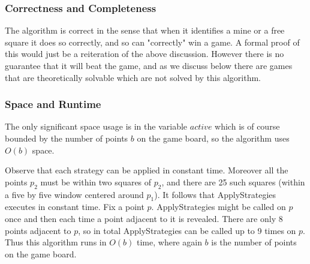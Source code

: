 \documentclass{article}
\theoremstyle{definition}
\theoremstyle{definition}
\theoremstyle{theorem}
\begin{document}
	
	\subsubsection{Correctness and Completeness}
	The algorithm is correct in the sense that when it identifies a mine or a free square it does so correctly, and so can "correctly" win a game. A formal proof of this would just be a reiteration of the above discussion. However there is no guarantee that it will beat the game, and as we discuss below there are games that are theoretically solvable which are not solved by this algorithm.
	\subsubsection{Space and Runtime}
	The only significant space usage is in the variable $active$ which is of course bounded by the number of points $b$ on the game board, so the algorithm uses $O(b)$ space.
	
	Observe that each strategy can be applied in constant time. Moreover all the points $p_2$ must be within two squares of $p_2$, and there are 25 such squares (within a five by five window centered around $p_1$). It follows that ApplyStrategies executes in constant time. Fix a point $p$. ApplyStrategies might be called on $p$ once and then each time a point adjacent to it is revealed. There are only 8 points adjacent to $p$, so in total ApplyStrategies can be called up to 9 times on $p$. Thus this algorithm runs in $O(b)$ time, where again $b$ is the number of points on the game board.
	
\end{document}
